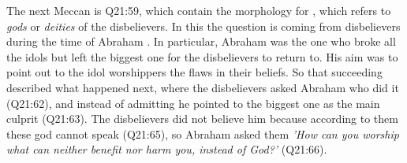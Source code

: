 












The next Meccan   is Q21:59, which contain the morphology for  , which refers to \textit{gods} or \textit{deities} of the disbelievers. In this   the question is coming from disbelievers during the time of Abraham . In particular, Abraham  was the one who broke all the idols but left the biggest one for the disbelievers to return to. His aim was to point out to the idol worshippers the flaws in their beliefs. So that succeeding   described what happened next, where the disbelievers asked Abraham  who did it (Q21:62), and instead of admitting he pointed to the biggest one as the main culprit (Q21:63). The disbelievers did not believe him because according to them these god cannot speak (Q21:65), so Abraham  asked them \textit{'How can you worship what can neither benefit nor harm you, instead of God?'} (Q21:66). 

